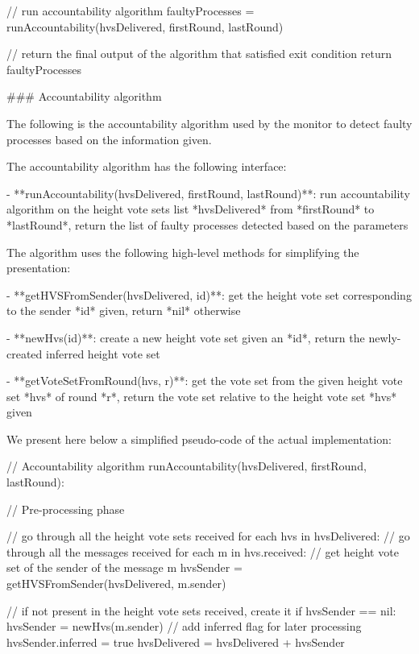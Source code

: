 \documentclass[a4paper,11pt,oneside]{report}
\begin{document}
\begin{markdown}
            // run accountability algorithm 
            faultyProcesses = runAccountability(hvsDelivered, firstRound, lastRound)    
           
            
        // return the final output of the algorithm that satisfied exit condition
        return faultyProcesses

### Accountability algorithm

The following is the accountability algorithm used by the monitor to detect faulty processes based on the information given.

The accountability algorithm has the following interface:

- **runAccountability(hvsDelivered, firstRound, lastRound)**: run accountability algorithm on the height vote sets list *hvsDelivered* from *firstRound* to *lastRound*, return the list of faulty processes detected based on the parameters

The algorithm uses the following high-level methods for simplifying the presentation:

- **getHVSFromSender(hvsDelivered, id)**: get the height vote set corresponding to the sender *id* given, return *nil* otherwise 

- **newHvs(id)**: create a new height vote set given an *id*, return the newly-created inferred height vote set

- **getVoteSetFromRound(hvs, r)**: get the vote set from the given height vote set *hvs* of round *r*, return the vote set relative to the height vote set *hvs* given

We present here below a simplified pseudo-code of the actual  implementation:
    
    // Accountability algorithm
    runAccountability(hvsDelivered, firstRound, lastRound):
    
        // Pre-processing phase
                
        // go through all the height vote sets received
        for each hvs in hvsDelivered:
            // go through all the messages received
            for each m in hvs.received:
                // get height vote set of the sender of the message m
                hvsSender = getHVSFromSender(hvsDelivered, m.sender)
                
                // if not present in the height vote sets received, create it 
                if hvsSender == nil:
                    hvsSender = newHvs(m.sender)
                    // add inferred flag for later processing
                    hvsSender.inferred = true
                    hvsDelivered = hvsDelivered + hvsSender 
                

\end{markdown}
\end{document}

